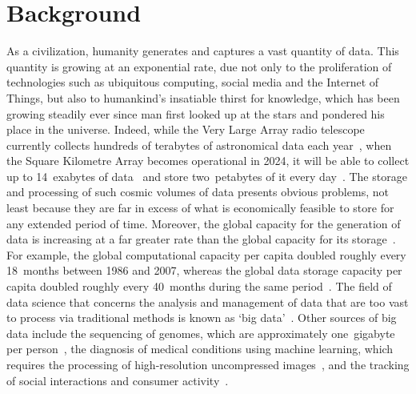 \section{Background}
\label{sec:introduction-background}

As a civilization, humanity generates and captures a vast quantity of data.
This quantity is growing at an exponential rate, due not only to the proliferation of technologies such as ubiquitous computing, social media and the Internet of Things, but also to humankind's insatiable thirst for knowledge, which has been growing steadily ever since man first looked up at the stars and pondered his place in the universe.
Indeed, while the Very Large Array radio telescope currently collects hundreds of terabytes of astronomical data each year~\citep{choi20}, when the Square Kilometre Array becomes operational in 2024, it will be able to collect up to \num{14}~exabytes of data~\citep{francis12} and store two~petabytes of it every day~\citep{choi20}.
The storage and processing of such cosmic volumes of data presents obvious problems, not least because they are far in excess of what is economically feasible to store for any extended period of time.
Moreover, the global capacity for the generation of data is increasing at a far greater rate than the global capacity for its storage~\citep{cormode20}.
For example, the global computational capacity per capita doubled roughly every \num{18}~months between 1986 and 2007, whereas the global data storage capacity per capita doubled roughly every \num{40}~months during the same period~\citep{hilbert11}.
The field of data science that concerns the analysis and management of data that are too vast to process via traditional methods is known as `big data'~\citep{ibm20}.
Other sources of big data include the sequencing of genomes, which are approximately one~gigabyte per person~\citep{cormode20}, the diagnosis of medical conditions using machine learning, which requires the processing of high-resolution uncompressed images~\citep{yanase19}, and the tracking of social interactions and consumer activity~\citep{ibm20}.

